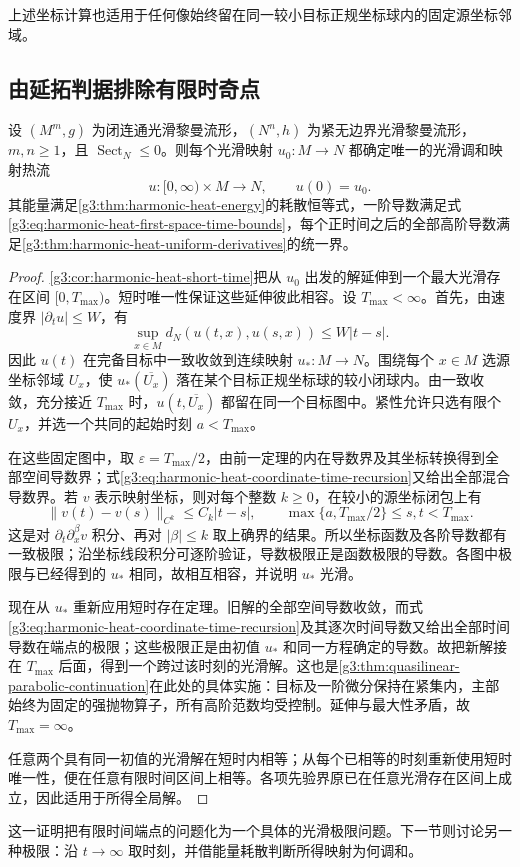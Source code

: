 上述坐标计算也适用于任何像始终留在同一较小目标正规坐标球内的固定源坐标邻域。

\subsection{由延拓判据排除有限时奇点}
\label{g3:subsec:2604:04}
\begin{theorem}\label{g3:thm:harmonic-heat-global-existence}
	设 \((M^m,g)\) 为闭连通光滑黎曼流形，\((N^n,h)\) 为紧无边界光滑黎曼流形，\(m,n\ge1\)，且 \(\operatorname{Sect}_N\le0\)。则每个光滑映射 \(u_0:M\to N\) 都确定唯一的光滑调和映射热流
	\[
		u:[0,\infty)\times M\longrightarrow N,\qquad u(0)=u_0.
	\]
	其能量满足\cref{g3:thm:harmonic-heat-energy}的耗散恒等式，一阶导数满足式\eqref{g3:eq:harmonic-heat-first-space-time-bounds}，每个正时间之后的全部高阶导数满足\cref{g3:thm:harmonic-heat-uniform-derivatives}的统一界。
\end{theorem}

\begin{proof}
	\cref{g3:cor:harmonic-heat-short-time}把从 \(u_0\) 出发的解延伸到一个最大光滑存在区间 \([0,T_{\max})\)。短时唯一性保证这些延伸彼此相容。设 \(T_{\max}<\infty\)。首先，由速度界 \(|\partial_tu|\le W\)，有
	\[
		\sup_{x\in M}d_N(u(t,x),u(s,x))\le W|t-s|.
	\]
	因此 \(u(t)\) 在完备目标中一致收敛到连续映射 \(u_*:M\to N\)。围绕每个 \(x\in M\) 选源坐标邻域 \(U_x\)，使 \(u_*(\overline{U_x})\) 落在某个目标正规坐标球的较小闭球内。由一致收敛，充分接近 \(T_{\max}\) 时，\(u(t,\overline{U_x})\) 都留在同一个目标图中。紧性允许只选有限个 \(U_x\)，并选一个共同的起始时刻 \(a<T_{\max}\)。

	在这些固定图中，取 \(\varepsilon=T_{\max}/2\)，由前一定理的内在导数界及其坐标转换得到全部空间导数界；式\eqref{g3:eq:harmonic-heat-coordinate-time-recursion}又给出全部混合导数界。若 \(v\) 表示映射坐标，则对每个整数 \(k\ge0\)，在较小的源坐标闭包上有
	\[
		\|v(t)-v(s)\|_{C^k}\le C_k|t-s|,
		\qquad \max\{a,T_{\max}/2\}\le s,t<T_{\max}.
	\]
	这是对 \(\partial_t\partial_x^\beta v\) 积分、再对 \(|\beta|\le k\) 取上确界的结果。所以坐标函数及各阶导数都有一致极限；沿坐标线段积分可逐阶验证，导数极限正是函数极限的导数。各图中极限与已经得到的 \(u_*\) 相同，故相互相容，并说明 \(u_*\) 光滑。

	现在从 \(u_*\) 重新应用短时存在定理。旧解的全部空间导数收敛，而式\eqref{g3:eq:harmonic-heat-coordinate-time-recursion}及其逐次时间导数又给出全部时间导数在端点的极限；这些极限正是由初值 \(u_*\) 和同一方程确定的导数。故把新解接在 \(T_{\max}\) 后面，得到一个跨过该时刻的光滑解。这也是\cref{g3:thm:quasilinear-parabolic-continuation}在此处的具体实施：目标及一阶微分保持在紧集内，主部始终为固定的强抛物算子，所有高阶范数均受控制。延伸与最大性矛盾，故 \(T_{\max}=\infty\)。

	任意两个具有同一初值的光滑解在短时内相等；从每个已相等的时刻重新使用短时唯一性，便在任意有限时间区间上相等。各项先验界原已在任意光滑存在区间上成立，因此适用于所得全局解。
\end{proof}

这一证明把有限时间端点的问题化为一个具体的光滑极限问题。下一节则讨论另一种极限：沿 \(t\to\infty\) 取时刻，并借能量耗散判断所得映射为何调和。

